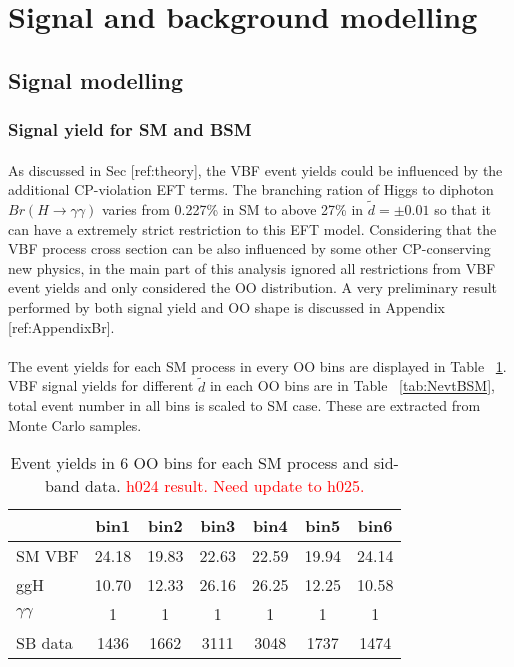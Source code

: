 \section{Signal and background modelling}
\label{sec:model}


\subsection{Signal modelling}
\label{subsec:sigmodel}

\subsubsection{Signal yield for SM and BSM}
\label{sssec:sigyield}
\paragraph{} As discussed in Sec [ref:theory], the VBF event yields could be influenced by the additional CP-violation EFT terms. The branching ration of Higgs to diphoton $Br(H\to\gamma\gamma)$ varies from 0.227\% in SM to above 27\% in $\tilde{d}=\pm 0.01$ so that it can have a extremely strict restriction to this EFT model. Considering that the VBF process cross section can be also influenced by some other CP-conserving new physics, in the main part of this analysis ignored all restrictions from VBF event yields and only considered the OO distribution. A very preliminary result performed by both signal yield and OO shape is discussed in Appendix [ref:AppendixBr]. 

\paragraph{} The event yields for each SM process in every OO bins are displayed in Table ~\ref{tab:NevtSM}. VBF signal yields for different $\tilde{d}$ in each OO bins are in Table ~\ref{tab:NevtBSM}, total event number in all bins is scaled to SM case. These are extracted from Monte Carlo samples. 

\begin{table}[h!]
\begin{center}
\begin{tabular}{l|cccccc}
\hline
        & bin1  & bin2  & bin3  & bin4  & bin5  & bin6  \\ \hline
SM VBF  & 24.18 & 19.83 & 22.63 & 22.59 & 19.94 & 24.14 \\
ggH     & 10.70 & 12.33 & 26.16 & 26.25 & 12.25 & 10.58 \\
$\gamma\gamma$ & 1  & 1 & 1     & 1     & 1     & 1     \\ 
SB data & 1436  & 1662  & 3111  & 3048  & 1737  & 1474  \\
\hline
\end{tabular}
\caption{Event yields in 6 OO bins for each SM process and sid-band data. \textcolor{red}{h024 result. Need update to h025.}}
\label{tab:NevtSM}
\end{center}
\end{table}

